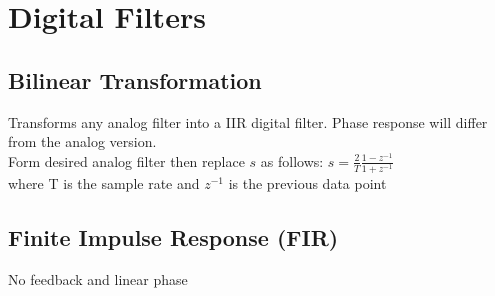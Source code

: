 \documentclass[11pt, oneside]{article}
\begin{document}
\section{Digital Filters}

\subsection{Bilinear Transformation}
Transforms any analog filter into a IIR digital filter.  Phase response will differ from the analog version.\\
Form desired analog filter then replace $s$ as follows: $s = \frac{2}{T}\frac{1-z^{-1}}{1+z^{-1}}$\\
where T is the sample rate and $z^{-1}$ is the previous data point\\

\subsection{Finite Impulse Response (FIR)}
No feedback and linear phase\\
\end{document}
